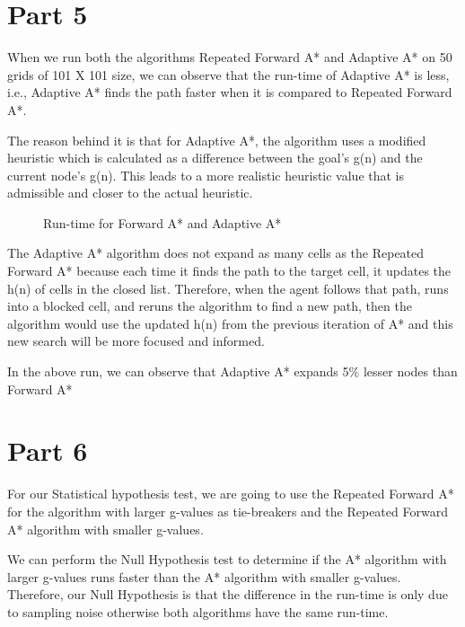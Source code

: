 \documentclass{article}
\begin{document}
\section*{Part 5}

When we run both the algorithms Repeated Forward A* and Adaptive A* on 50 grids of 101 X 101 size, we can observe that the run-time of Adaptive A* is less, i.e., Adaptive A* finds the path faster when it is compared to Repeated Forward A*.

The reason behind it is that for Adaptive A*, the algorithm uses a modified heuristic which is calculated as a difference between the goal’s g(n) and the current node’s g(n). This leads to a more realistic heuristic value that is admissible and closer to the actual heuristic. 

\begin{figure}[!ht]
    \centering
    \caption{Run-time for Forward A* and Adaptive A*}
    \label{fig:my_label}
\end{figure}

The Adaptive A* algorithm does not expand as many cells as the Repeated Forward A* because each time it finds the path to the target cell, it updates the h(n) of cells in the closed list. Therefore, when the agent follows that path, runs into a blocked cell, and reruns the algorithm to find a new path, then the algorithm would use the updated h(n) from the previous iteration of A* and this new search will be more focused and informed.\cite{4}

In the above run, we can observe that Adaptive A* expands 5$\%$ lesser nodes than Forward A*
   

\section*{Part 6}

For our Statistical hypothesis test, we are going to use the Repeated Forward A* for the algorithm with larger g-values as tie-breakers and the Repeated Forward A* algorithm with smaller g-values.

We can perform the Null Hypothesis test to determine if the A* algorithm with larger g-values runs faster than the A* algorithm with smaller g-values. Therefore, our Null Hypothesis is that the difference in the run-time is only due to sampling noise otherwise both algorithms have the same run-time.\cite{2}
\end{document}
